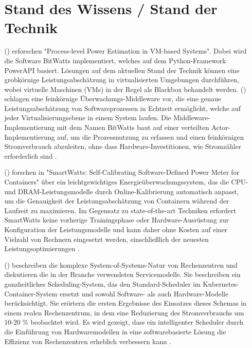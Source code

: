 \chapter{Stand des Wissens / Stand der Technik}

\citeauthor{colmant:hal-01130030} (\citeyear{colmant:hal-01130030})
erforschen "Process-level Power Estimation in VM-based Systems".
Dabei wird die Software BitWatts implementiert,
welches auf dem Python-Framework PowerAPI basiert.
Lösungen auf dem aktuellen Stand der Technik können eine grobkörnige Leistungsabschätzung 
in virtualisierten Umgebungen durchführen, 
wobei virtuelle Maschinen (VMs) in der Regel als Blackbox behandelt werden.
\citeauthor{colmant:hal-01130030} (\citeyear{colmant:hal-01130030})
schlagen eine feinkörnige Überwachungs-Middleware vor, 
die eine genaue Leistungsabschätzung von Softwareprozessen in Echtzeit ermöglicht, 
welche auf jeder Virtualisierungsebene in einem System laufen.
Die Middleware-Implementierung mit dem Namen BitWatts 
baut auf einer verteilten Actor-Implementierung auf, 
um die Prozessnutzung zu erfassen und einen feinkörnigen Stromverbrauch abzuleiten, 
ohne dass Hardware-Investitionen, wie Stromzähler erforderlich sind
\autocite{colmant:hal-01130030}.
\bigskip

\citeauthor{fieni:hal-02470128} (\citeyear{fieni:hal-02470128})
forschen in
"SmartWatts: Self-Calibrating Software-Defined Power Meter for Containers"
über ein leichtgewichtiges Energieüberwachungssystem, das die CPU- und DRAM-Leistungsmodelle 
durch Online-Kalibrierung automatisch anpasst, um die Genauigkeit der Leistungsabschätzung von Containern 
während der Laufzeit zu maximieren. Im Gegensatz zu state-of-the-art Techniken erfordert SmartWatts keine vorherige
Trainingsphase oder Hardware-Ausrüstung zur Konfiguration der Leistungsmodelle und kann daher ohne Kosten 
auf einer Vielzahl von Rechnern eingesetzt werden, einschließlich der neuesten Leistungsoptimierungen
\autocite{fieni:hal-02470128}.
\bigskip

\citeauthor{8705815} (\citeyear{8705815})
beschreiben die komplexe System-of-Systems-Natur von Rechenzentren und diskutieren 
die in der Branche verwendeten Servicemodelle. Sie beschreiben ein ganzheitliches Scheduling-System, 
das den Standard-Scheduler im Kubernetes-Container-System ersetzt 
und sowohl Software- als auch Hardware-Modelle berücksichtigt. 
Sie erörtern die ersten Ergebnisse des Einsatzes dieses Schemas in einem realen Rechenzentrum, 
in dem eine Reduzierung des Stromverbrauchs um 10-20 \% beobachtet wird. 
Es wird gezeigt, dass ein intelligenter Scheduler durch die Einführung von Hardwaremodellen 
in eine softwarebasierte Lösung die Effizienz von Rechenzentren erheblich verbessern kann
\autocite{8705815}.







